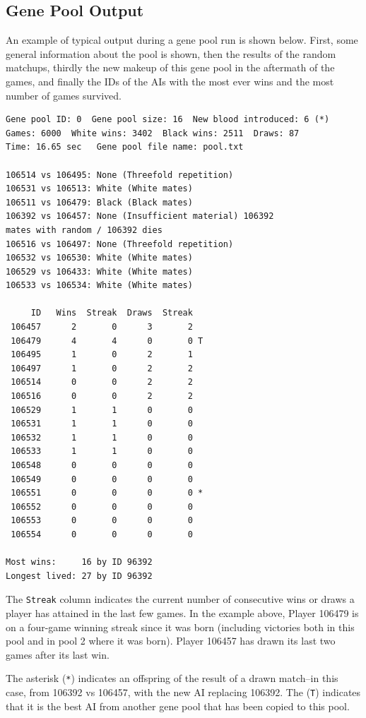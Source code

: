 \documentclass[letterpaper]{article}
\renewcommand{\_}{\allowbreak\textunderscore\allowbreak}
\begin{document}
\subsection{Gene Pool Output}
An example of typical output during a gene pool run is shown below. First, some general information about the pool is shown, then the results of the random matchups, thirdly the new makeup of this gene pool in the aftermath of the games, and finally the IDs of the AIs with the most ever wins and the most number of games survived.
\begin{verbatim}
Gene pool ID: 0  Gene pool size: 16  New blood introduced: 6 (*)
Games: 6000  White wins: 3402  Black wins: 2511  Draws: 87
Time: 16.65 sec   Gene pool file name: pool.txt

106514 vs 106495: None (Threefold repetition) 
106531 vs 106513: White (White mates) 
106511 vs 106479: Black (Black mates) 
106392 vs 106457: None (Insufficient material) 106392
mates with random / 106392 dies
106516 vs 106497: None (Threefold repetition) 
106532 vs 106530: White (White mates) 
106529 vs 106433: White (White mates) 
106533 vs 106534: White (White mates) 

     ID   Wins  Streak  Draws  Streak
 106457      2       0      3       2
 106479      4       4      0       0 T
 106495      1       0      2       1
 106497      1       0      2       2
 106514      0       0      2       2
 106516      0       0      2       2
 106529      1       1      0       0
 106531      1       1      0       0
 106532      1       1      0       0
 106533      1       1      0       0
 106548      0       0      0       0
 106549      0       0      0       0
 106551      0       0      0       0 *
 106552      0       0      0       0
 106553      0       0      0       0
 106554      0       0      0       0

Most wins:     16 by ID 96392
Longest lived: 27 by ID 96392

\end{verbatim}
The \verb|Streak| column indicates the current number of consecutive wins or draws a player has attained in the last few games. In the example above, Player 106479 is on a four-game winning streak since it was born (including victories both in this pool and in pool 2 where it was born). Player 106457 has drawn its last two games after its last win.

The asterisk (\verb|*|) indicates an offspring of the result of a drawn match--in this case, from 106392 vs 106457, with the new AI replacing 106392. The (\verb|T|) indicates that it is the best AI from another gene pool that has been copied to this pool.
\end{document}
